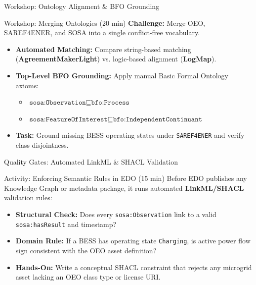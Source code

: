\documentclass[aspectratio=169]{beamer}
\let\pause\relax
\begin{document}
\begin{frame}{Workshop: Ontology Alignment \& BFO Grounding}
    \begin{block}{Workshop: Merging Ontologies (20 min)}
        \textbf{Challenge:} Merge OEO, SAREF4ENER, and SOSA into a single conflict-free vocabulary.
        \pause
        \begin{itemize}
            \item \textbf{Automated Matching:} Compare string-based matching (\textbf{AgreementMakerLight}) vs. logic-based alignment (\textbf{LogMap}).
            \item \textbf{Top-Level BFO Grounding:} Apply manual Basic Formal Ontology axioms:
            \begin{itemize}
                \item $\texttt{sosa:Observation} \sqsubseteq \texttt{bfo:Process}$
                \item $\texttt{sosa:FeatureOfInterest} \sqsubseteq \texttt{bfo:IndependentContinuant}$
            \end{itemize}
            \item \textbf{Task:} Ground missing BESS operating states under \texttt{SAREF4ENER} and verify class disjointness.
        \end{itemize}
    \end{block}
\end{frame}

\begin{frame}{Quality Gates: Automated LinkML \& SHACL Validation}
    \begin{block}{Activity: Enforcing Semantic Rules in EDO (15 min)}
        Before EDO publishes any Knowledge Graph or metadata package, it runs automated \textbf{LinkML/SHACL} validation rules:
        \pause
        \begin{itemize}
            \item \textbf{Structural Check:} Does every \texttt{sosa:Observation} link to a valid \texttt{sosa:hasResult} and timestamp?
            \item \textbf{Domain Rule:} If a BESS has operating state \texttt{Charging}, is active power flow sign consistent with the OEO asset definition?
            \item \textbf{Hands-On:} Write a conceptual SHACL constraint that rejects any microgrid asset lacking an OEO class type or license URI.
        \end{itemize}
    \end{block}
\end{frame}
\end{document}
